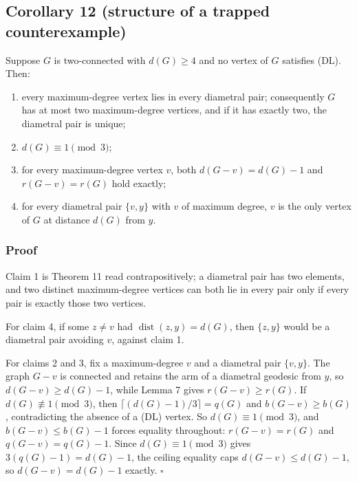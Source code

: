 \documentclass[
  11pt,
  letterpaper,
]{article}
\providecommand{\tightlist}{%
  \setlength{\itemsep}{0pt}\setlength{\parskip}{0pt}}
\begin{document}
\subsection{Corollary 12 (structure of a trapped
counterexample)}\label{corollary-12-structure-of-a-trapped-counterexample}

Suppose \(G\) is two-connected with \(d(G)\ge4\) and no vertex of \(G\)
satisfies (DL). Then:

\begin{enumerate}
\def\labelenumi{\arabic{enumi}.}
\tightlist
\item
  every maximum-degree vertex lies in every diametral pair; consequently
  \(G\) has at most two maximum-degree vertices, and if it has exactly
  two, the diametral pair is unique;
\item
  \(d(G)\equiv1\pmod3\);
\item
  for every maximum-degree vertex \(v\), both \(d(G-v)=d(G)-1\) and
  \(r(G-v)=r(G)\) hold exactly;
\item
  for every diametral pair \(\{v,y\}\) with \(v\) of maximum degree,
  \(v\) is the only vertex of \(G\) at distance \(d(G)\) from \(y\).
\end{enumerate}

\subsubsection{Proof}\label{proof-11}

Claim 1 is Theorem 11 read contrapositively; a diametral pair has two
elements, and two distinct maximum-degree vertices can both lie in every
pair only if every pair is exactly those two vertices.

For claim 4, if some \(z\ne v\) had \(\operatorname{dist}(z,y)=d(G)\),
then \(\{z,y\}\) would be a diametral pair avoiding \(v\), against claim
1.

For claims 2 and 3, fix a maximum-degree \(v\) and a diametral pair
\(\{v,y\}\). The graph \(G-v\) is connected and retains the arm of a
diametral geodesic from \(y\), so \(d(G-v)\ge d(G)-1\), while Lemma 7
gives \(r(G-v)\ge r(G)\). If \(d(G)\not\equiv1\pmod3\), then
\(\lceil(d(G)-1)/3\rceil=q(G)\) and \(b(G-v)\ge b(G)\), contradicting
the absence of a (DL) vertex. So \(d(G)\equiv1\pmod3\), and
\(b(G-v)\le b(G)-1\) forces equality throughout: \(r(G-v)=r(G)\) and
\(q(G-v)=q(G)-1\). Since \(d(G)\equiv1\pmod3\) gives
\(3(q(G)-1)=d(G)-1\), the ceiling equality caps \(d(G-v)\le d(G)-1\), so
\(d(G-v)=d(G)-1\) exactly. \(\square\)
\end{document}
